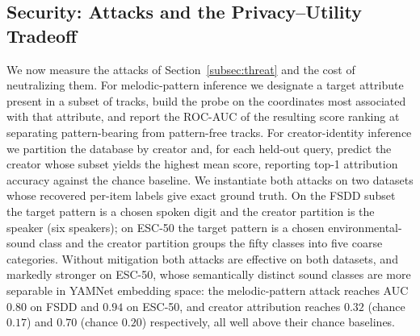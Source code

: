 \documentclass[sigconf,nonacm]{acmart}
\begin{document}
\begin{table}[t]
\centering\setlength{\tabcolsep}{4pt}
\caption{nDCG@10 of WHIP with uniform versus learned per-block weights on held-out queries. When blocks differ in relevance, learned weights improve nDCG@10 by 0.12 to 0.27; when all blocks are equally informative, they stay near uniform. Encrypted WHIP matches plaintext weighted scores to within $10^{-5}$.}
\label{tab:weighting}
\end{table}

\subsection{Security: Attacks and the Privacy--Utility Tradeoff}
\label{sec:security}
We now measure the attacks of Section~\ref{subsec:threat} and the cost of neutralizing them. For melodic-pattern inference we designate a target attribute present in a subset of tracks, build the probe on the coordinates most associated with that attribute, and report the ROC-AUC of the resulting score ranking at separating pattern-bearing from pattern-free tracks. For creator-identity inference we partition the database by creator and, for each held-out query, predict the creator whose subset yields the highest mean score, reporting top-1 attribution accuracy against the chance baseline. We instantiate both attacks on two datasets whose recovered per-item labels give exact ground truth. On the FSDD subset the target pattern is a chosen spoken digit and the creator partition is the speaker (six speakers); on ESC-50 the target pattern is a chosen environmental-sound class and the creator partition groups the fifty classes into five coarse categories. Without mitigation both attacks are effective on both datasets, and markedly stronger on ESC-50, whose semantically distinct sound classes are more separable in YAMNet embedding space: the melodic-pattern attack reaches AUC $0.80$ on FSDD and $0.94$ on ESC-50, and creator attribution reaches $0.32$ (chance $0.17$) and $0.70$ (chance $0.20$) respectively, all well above their chance baselines.
\end{document}
